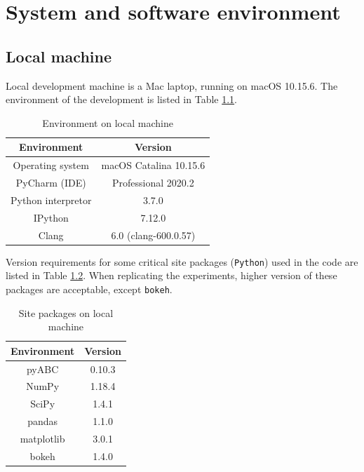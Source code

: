 \appendix

\chapter{System and software environment}

\section{Local machine}

Local development machine is a Mac laptop, running on macOS 10.15.6. The environment of the development is listed in Table \ref{table:local_macine}.

\begin{table}[H]
    \centering
    \begin{tabular}{|c c|}
        \hline
        Environment        & Version                \\ [0.5ex]
        \hline\hline
        Operating system   & macOS Catalina 10.15.6 \\
        PyCharm (IDE)      & Professional 2020.2    \\
        Python interpretor & 3.7.0                  \\
        IPython            & 7.12.0                 \\
        Clang              & 6.0 (clang-600.0.57)   \\
        \hline
    \end{tabular}
    \caption{Environment on local machine}
    \label{table:local_macine}
\end{table}

Version requirements for some critical site packages (\verb|Python|) used in the code are listed in Table \ref{table:local_package}. When replicating the experiments, higher version of these packages are acceptable, except \verb|bokeh|.

\begin{table}
    \centering
    \begin{tabular}{|c c|}
        \hline
        Environment & Version \\ [0.5ex]
        \hline\hline
        pyABC       & 0.10.3  \\
        NumPy       & 1.18.4  \\
        SciPy       & 1.4.1   \\
        pandas      & 1.1.0   \\
        matplotlib  & 3.0.1   \\
        bokeh       & 1.4.0   \\
        \hline
    \end{tabular}
    \caption{Site packages on local machine}
    \label{table:local_package}
\end{table}


